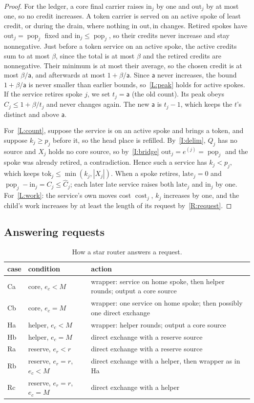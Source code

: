 \documentclass[11pt]{amsart}
\theoremstyle{definition}
\newcommand{\pop}{\operatorname{pop}}
\newcommand{\cost}{\operatorname{cost}}
\begin{document}
\begin{proof}
For the ledger, a core final carrier raises $\mathrm{in}_j$ by one and $\mathrm{out}_j$ by at most one, so no credit increases.
A token carrier is served on an active spoke of least credit, or during the drain, where nothing in $\mathrm{out},\mathrm{in}$ changes.
Retired spokes have $\mathrm{out}_j=\pop_j$ fixed and $\mathrm{in}_j\le\pop_j$, so their credits never increase and stay nonnegative.
Just before a token service on an active spoke, the active credits sum to at most $\beta$, since the total is at most $\beta$ and the
retired credits are nonnegative. Their minimum is at most their average, so the chosen credit is at most $\beta/\mathsf a$, and
afterwards at most $1+\beta/\mathsf a$. Since $\mathsf a$ never increases, the bound $1+\beta/\mathsf a$ is never smaller than earlier bounds,
so~\ref{L:peak} holds for active spokes. If the service retires spoke $j$, we set $t_j=\mathsf a$ (the old count). Its peak obeys
$\hat C_j\le1+\beta/t_j$ and never changes again. The new $\mathsf a$ is $t_j-1$, which keeps the $t$'s distinct and above $\mathsf a$.

For~\ref{L:count}, suppose the service is on an active spoke and brings a token, and suppose $k_j\ge p_j$ before it, so the head
place is refilled. By~\ref{I:delim}, $Q_j$ has no source and $X_j$ holds no core source, so by~\ref{I:bridge}
$\mathrm{out}_j=e^{(j)}=\pop_j$ and the spoke was already retired, a contradiction. Hence such a service has $k_j<p_j$, which keeps
$\mathrm{tok}_j\le\min(k_j,|X_j|)$. When a spoke retires, $\mathrm{late}_j=0$ and $\pop_j-\mathrm{in}_j=C_j\le\hat C_j$; each later late service raises both
$\mathrm{late}_j$ and $\mathrm{in}_j$ by one. For~\ref{L:work}: the service's own moves cost $\cost_j$, $k_j$ increases by one, and the
child's work increases by at least the length of its request by~\ref{R:request}.
\end{proof}

\subsection{Answering requests}

\begin{table}[ht]
\centering
\begin{tabular}{l|l|p{7.2cm}}
case & condition & action\\\hline
Ca & core, $e_c<M$ & wrapper: service on home spoke, then helper rounds; output a core source\\
Cb & core, $e_c=M$ & wrapper: one service on home spoke; then possibly one direct exchange\\
Ha & helper, $e_c<M$ & wrapper: helper rounds; output a core source\\
Hb & helper, $e_c=M$ & direct exchange with a reserve source\\
Ra & reserve, $e_r<r$ & direct exchange with a reserve source\\
Rb & reserve, $e_r=r$, $e_c<M$ & direct exchange with a helper, then wrapper as in Ha\\
Rc & reserve, $e_r=r$, $e_c=M$ & direct exchange with a helper
\end{tabular}
\caption{How a star router answers a request.}\label{tab:cases}
\end{table}
\end{document}
